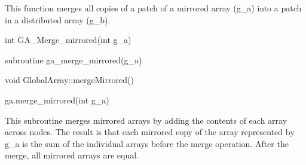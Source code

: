 \documentclass[12pt]{article}
\begin{document}
\gcoll

\begin{desc}
This function merges all copies of a patch of a mirrored array (g_a) into a
patch in a distributed array (g_b).
\end{desc}



\begin{capi}
\begin{ccode}
int GA_Merge_mirrored(int g_a)
\end{ccode}
\begin{funcargs}
\end{funcargs}
\end{capi}

\begin{fapi}
\begin{fcode}
subroutine ga_merge_mirrored(g_a)
\end{fcode}
\begin{funcargs}
\end{funcargs}
\end{fapi}

\begin{cxxapi}
\begin{cxxcode}
void GlobalArray::mergeMirrored()
\end{cxxcode}
\end{cxxapi}

\begin{pyapi}
\begin{pycode}
ga.merge_mirrored(int g_a)
\end{pycode}
\begin{funcargs}
\end{funcargs}
\end{pyapi}

\gcoll

\begin{desc}
This subroutine merges mirrored arrays by adding the contents of each array
across nodes. The result is that each mirrored copy of the array represented by
g_a is the sum of the individual arrays before the merge operation. After the
merge, all mirrored arrays are equal.
\end{desc}

\end{document}
